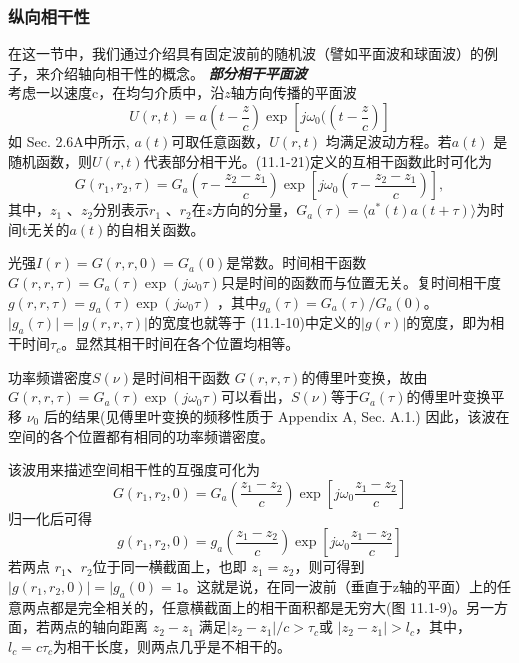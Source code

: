 \documentclass[UTF8]{ctexart}
\numberwithin{figure}{subsection}
\numberwithin{table}{subsection}
\begin{document}
\subsubsection{纵向相干性}
\endgroup
在这一节中，我们通过介绍具有固定波前的随机波（譬如平面波和球面波）的例子，来介绍轴向相干性的概念。
\bigbreak\noindent\textcolor{ksc}{\textbf{\textsl{部分相干平面波}}}\\
考虑一以速度c，在均匀介质中，沿$z$轴方向传播的平面波
\begin{equation}
U(r, t) = a (t - \frac{z}{c}) \exp[j\omega_0 ((t - \frac{z}{c})]
\end{equation}
如 Sec. 2.6A中所示, $ a(t) $可取任意函数，$ U(r,t) $ 均满足波动方程。若$ a(t) $ 是随机函数，则$ U(r,t) $代表部分相干光。(11.1-21)定义的互相干函数此时可化为
\begin{equation}
G(r_1, r_2, \tau) = G_a (\tau - \frac{z_2 - z_1}{c}) \exp [j\omega_0 (\tau - \frac{z_2 - z_1}{c})] ,
\end{equation}
其中，$ z_1 $ 、$ z_2 $分别表示$ r_1 $ 、$ r_2 $在$z$方向的分量，$G_a (\tau) = \langle a^\ast (t) a(t + \tau) \rangle $为时间t无关的$ a(t) $的自相关函数。
\par 光强$ I(r) = G(r, r, 0) = G_a (0) $是常数。时间相干函数$ G(r, r, \tau) = G_a (\tau) \exp (j\omega_0 \tau) $只是时间的函数而与位置无关。复时间相干度$ g(r, r, \tau) = g_a (\tau) \exp(j\omega_0 \tau) $ ，其中$ g_a (\tau) = G_a (\tau) / G_a (0) $。$ \lvert g_a (\tau) \rvert = \lvert g(r, r, \tau) \rvert $的宽度也就等于 (11.1-10)中定义的$\lvert g(r) \rvert$的宽度，即为相干时间$ \tau_c $。显然其相干时间在各个位置均相等。
\par 功率频谱密度$ S(\nu) $是时间相干函数 $ G(r, r, \tau) $的傅里叶变换，故由$ G(r, r, \tau) = G_a (\tau) \exp (j\omega_0 \tau) $可以看出，$ S(\nu) $等于$ G_a (\tau) $的傅里叶变换平移 $ \nu_0 $ 后的结果(见傅里叶变换的频移性质于 Appendix A, Sec. A.1.) 因此，该波在空间的各个位置都有相同的功率频谱密度。
\par 该波用来描述空间相干性的互强度可化为
\begin{equation}
G(r_1, r_2, 0) = G_a (\frac{z_1 - z_2}{c}) \exp[j\omega_0 \frac{z_1 - z_2}{c}]
\end{equation}
归一化后可得
\begin{equation}
g(r_1, r_2, 0) = g_a (\frac{z_1 - z_2}{c}) \exp[j\omega_0 \frac{z_1 - z_2}{c}]
\end{equation}
若两点 $ r_1 $、$ r_2 $位于同一横截面上，也即 $ z_1 = z_2 $，则可得到$ \lvert g(r_1, r_2, 0) \rvert = \lvert g_a (0) = 1 $。这就是说，在同一波前（垂直于z轴的平面）上的任意两点都是完全相关的，任意横截面上的相干面积都是无穷大(图 11.1-9)。另一方面，若两点的轴向距离 $ z_2 - z_1 $  满足$ \lvert z_2 - z_1 \rvert / c > \tau_c $或 $ \lvert z_2 - z_1 \rvert > l_c $，其中，$ l_c = c\tau_c $为相干长度，则两点几乎是不相干的。
\end{document}
